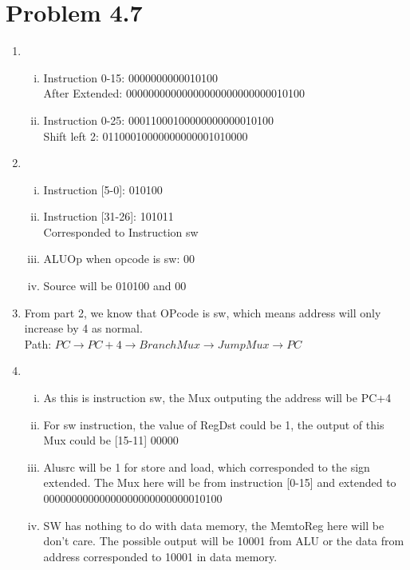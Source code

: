 \documentclass{article}
\def\math#1{$#1$}
\begin{document}
\section{Problem 4.7}
\begin{enumerate}[1)]
    \item 
        \begin{enumerate}[i)]
            \item Instruction 0-15: 0000000000010100 \\
                After Extended: 00000000000000000000000000010100 
            \item Instruction 0-25: 00011000100000000000010100 \\
                Shift left 2: 01100010000000000001010000
        \end{enumerate}
    \item 
        \begin{enumerate}[i)]
            \item Instruction [5-0]: 010100
            \item Instruction [31-26]: 101011 \\
                  Corresponded to Instruction sw
            \item ALUOp when opcode is sw: 00
            \item Source will be 010100 and 00
        \end{enumerate}
    \item From part 2, we know that OPcode is sw, which means address will only increase by 4 as normal. \\
    Path: \math{PC \to PC + 4 \to Branch Mux \to Jump Mux \to PC}
    \item 
        \begin{enumerate}[i)]
            \item As this is instruction sw, the Mux outputing the address will be PC+4
            \item For sw instruction, the value of RegDst could be 1, the output of this Mux could be [15-11] 00000
            \item Alusrc will be 1 for store and load, which corresponded to the sign extended. The Mux here will be from instruction [0-15] and extended to  00000000000000000000000000010100
            \item SW has nothing to do with data memory, the MemtoReg here will be don't care. The possible output will be 10001 from ALU or the data from address corresponded to 10001 in data memory.
        \end{enumerate}

\end{enumerate}
\end{document}
